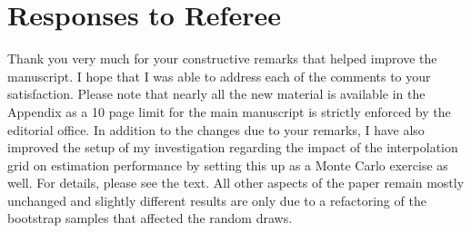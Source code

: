 \newpage\section*{Responses to Referee}\vspace{1.0cm}
Thank you very much for your constructive remarks that helped improve the manuscript. I hope that I was able to address each of the comments to your satisfaction. Please note that nearly all the new material is available in the Appendix as a 10 page limit for the main manuscript is strictly enforced by the editorial office. In addition to the changes due to your remarks, I have also improved the setup of my investigation regarding the impact of the interpolation grid on estimation performance by setting this up as a Monte Carlo exercise as well. For details, please see the text. All other aspects of the paper remain mostly unchanged and slightly different results are only due to a refactoring of the bootstrap samples that affected the random draws.
